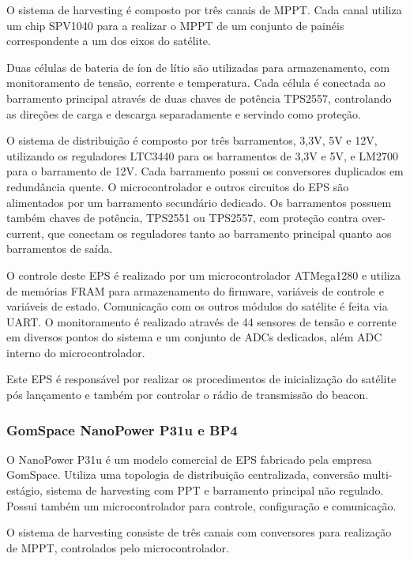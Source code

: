 O sistema de harvesting é composto por três canais de \gls{MPPT}. Cada canal utiliza um chip SPV1040 para a realizar o \gls{MPPT} de um conjunto de painéis correspondente a um dos eixos do satélite.

Duas células de bateria de íon de lítio são utilizadas para armazenamento, com monitoramento de tensão, corrente e temperatura. Cada célula é conectada ao barramento principal através de duas chaves de potência TPS2557, controlando as direções de carga e descarga separadamente e servindo como proteção.

O sistema de distribuição é composto por três barramentos, 3,3V, 5V e 12V, utilizando os reguladores LTC3440 para os barramentos de 3,3V e 5V, e LM2700 para o barramento de 12V.
Cada barramento possui os conversores duplicados em redundância quente.
O microcontrolador e outros circuitos do \gls{EPS} são alimentados por um barramento secundário dedicado.
Os barramentos possuem também chaves de potência, TPS2551 ou TPS2557, com proteção contra over-current, que conectam os reguladores tanto ao barramento principal quanto aos barramentos de saída.

O controle deste \gls{EPS} é realizado por um microcontrolador ATMega1280 e utiliza de memórias FRAM para armazenamento do firmware, variáveis de controle e variáveis de estado.
Comunicação com os outros módulos do satélite é feita via \gls{UART}.
O monitoramento é realizado através de 44 sensores de tensão e corrente em diversos pontos do sistema e um conjunto de ADCs dedicados, além ADC interno do microcontrolador.

Este \gls{EPS} é responsável por realizar os procedimentos de inicialização do satélite pós lançamento e também por controlar o rádio de transmissão do beacon.




\subsubsection{GomSpace NanoPower P31u e BP4}

O NanoPower P31u \cite{p31u-datasheet} é um modelo comercial de \gls{EPS} fabricado pela empresa GomSpace. Utiliza uma topologia de distribuição centralizada, conversão multi-estágio, sistema de harvesting com \gls{PPT} e barramento principal não regulado. Possui também um microcontrolador para controle, configuração e comunicação.

O sistema de harvesting consiste de três canais com conversores para realização de \gls{MPPT}, controlados pelo microcontrolador.

